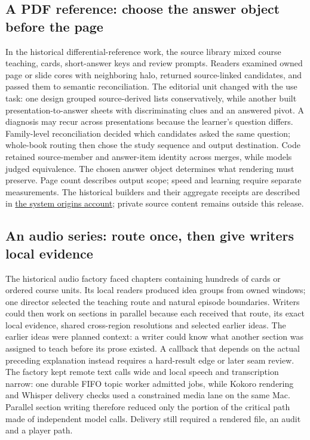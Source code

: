 \documentclass[11pt,letterpaper]{article}
\begin{document}
\subsection{A PDF reference: choose the answer object before the page}
In the historical differential-reference work, the source library mixed course teaching, cards, short-answer keys and review prompts. Readers examined owned page or slide cores with neighboring halo, returned source-linked candidates, and passed them to semantic reconciliation. The editorial unit changed with the use task: one design grouped source-derived lists conservatively, while another built presentation-to-answer sheets with discriminating clues and an answered pivot. A diagnosis may recur across presentations because the learner's question differs. Family-level reconciliation decided which candidates asked the same question; whole-book routing then chose the study sequence and output destination. Code retained source-member and answer-item identity across merges, while models judged equivalence. The chosen answer object determines what rendering must preserve. Page count describes output scope; speed and learning require separate measurements. The historical builders and their aggregate receipts are described in \href{https://github.com/FadiBahodi/lamina/blob/main/docs/system-origins.md}{the system origins account}; private source content remains outside this release.

\subsection{An audio series: route once, then give writers local evidence}
The historical audio factory faced chapters containing hundreds of cards or ordered course units. Its local readers produced idea groups from owned windows; one director selected the teaching route and natural episode boundaries. Writers could then work on sections in parallel because each received that route, its exact local evidence, shared cross-region resolutions and selected earlier ideas. The earlier ideas were planned context: a writer could know what another section was assigned to teach before its prose existed. A callback that depends on the actual preceding explanation instead requires a hard-result edge or later seam review. The factory kept remote text calls wide and local speech and transcription narrow: one durable FIFO topic worker admitted jobs, while Kokoro rendering and Whisper delivery checks used a constrained media lane on the same Mac. Parallel section writing therefore reduced only the portion of the critical path made of independent model calls. Delivery still required a rendered file, an audit and a player path.
\end{document}
